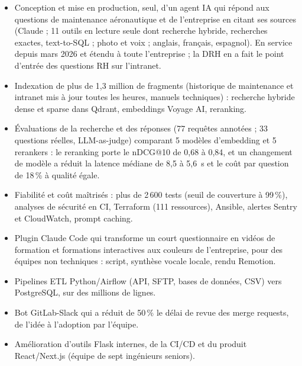 \documentclass[a4paper,10pt]{article}
\begin{document}
\begin{itemize}
  \item Conception et mise en production, seul, d'un agent IA qui répond aux questions de maintenance
        aéronautique et de l'entreprise en citant ses sources (Claude ; 11 outils en lecture seule dont recherche hybride,
        recherches exactes, text-to-SQL ; photo et voix ; anglais, français, espagnol). En service depuis mars 2026 et étendu
        à toute l'entreprise ; la DRH en a fait le point d'entrée des questions RH sur l'intranet.
  \item Indexation de plus de 1,3 million de fragments (historique de maintenance et intranet mis à jour toutes les
        heures, manuels techniques) : recherche hybride dense et sparse dans Qdrant, embeddings Voyage AI, reranking.
  \item Évaluations de la recherche et des réponses (77 requêtes annotées ; 33 questions réelles, LLM-as-judge)
        comparant 5 modèles d'embedding et 5 rerankers : le reranking porte le nDCG@10 de 0,68 à 0,84,
        et un changement de modèle a réduit la latence médiane de 8,5 à 5,6~s et le coût par question de 18\,\%
        à qualité égale.
  \item Fiabilité et coût maîtrisés : plus de 2\,600 tests (seuil de couverture à 99\,\%), analyses de sécurité
        en CI, Terraform (111 ressources), Ansible, alertes Sentry et CloudWatch, prompt caching.
  \item Plugin Claude Code qui transforme un court questionnaire en vidéos de formation et formations interactives
        aux couleurs de l'entreprise, pour des équipes non techniques : script, synthèse vocale locale, rendu Remotion.
\end{itemize}
\entrygap

\begin{itemize}
  \item Pipelines ETL Python/Airflow (API, SFTP, bases de données, CSV) vers PostgreSQL, sur des millions de lignes.
  \item Bot GitLab-Slack qui a réduit de 50\,\% le délai de revue des merge requests, de l'idée à l'adoption par l'équipe.
  \item Amélioration d'outils Flask internes, de la CI/CD et du produit React/Next.js (équipe de sept ingénieurs seniors).
\end{itemize}
\entrygap
\end{document}
